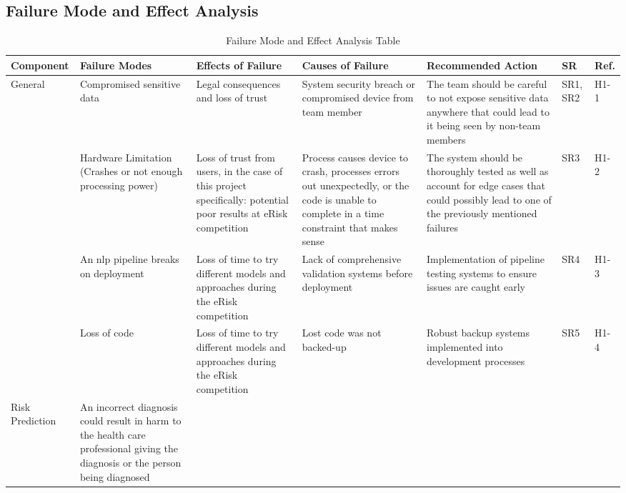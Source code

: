 \documentclass{article}
\begin{document}
\begin{landscape}
    \section{Failure Mode and Effect Analysis}
    \begin{longtable}{|p{}|p{}|p{}|p{}|p{}|p{}|p{}|}
        \caption{Failure Mode and Effect Analysis Table} \\
        \hline
        \textbf{Component} & \textbf{Failure Modes} & \textbf{Effects of Failure} & \textbf{Causes of Failure} & \textbf{Recommended Action} & \textbf{SR} & \textbf{Ref.} \\
        \hline
        \multirow{4}{*}{General} 
        & Compromised sensitive data
        & Legal consequences and loss of trust 
        & System security breach or compromised device from team member 
        & The team should be careful to not expose sensitive data anywhere that could lead to it being seen by non-team members 
        & SR1, SR2
        & H1-1 \\
        \cline{2-7}
        & Hardware Limitation (Crashes or not enough processing power)
        & Loss of trust from users, in the case of this project specifically: potential poor results at eRisk competition
        & Process causes device to crash, processes errors out unexpectedly, or the code is unable to complete in a time constraint that makes sense 
        & The system should be thoroughly tested as well as account for edge cases that could possibly lead to one of the previously mentioned failures  
        & SR3 
        & H1-2 \\
        \cline{2-7}
        & An nlp pipeline breaks on deployment
        & Loss of time to try different models and approaches during the eRisk competition
        & Lack of comprehensive validation systems before deployment
        & Implementation of pipeline testing systems to ensure issues are caught early
        & SR4
        & H1-3 \\
        \cline{2-7}
        \newpage \cline{2-7}
        & Loss of code
        & Loss of time to try different models and approaches during the eRisk competition
        & Lost code was not backed-up
        & Robust backup systems implemented into development processes
        & SR5
        & H1-4 \\
        \hline
        \multirow{2}{*}{Risk Prediction} 
        & An incorrect diagnosis could result in harm to the health care professional giving the diagnosis or the person being diagnosed

\end{longtable}
\end{landscape}
\end{document}
